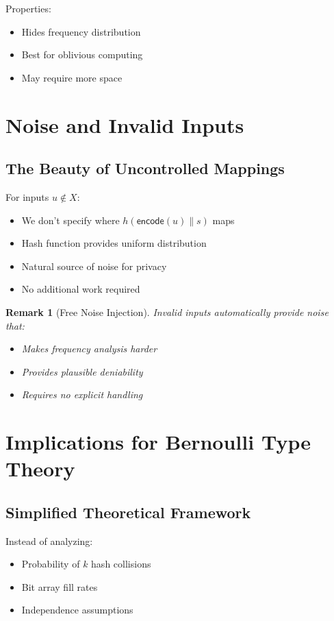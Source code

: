 \documentclass[11pt,final,hidelinks]{article}
\newtheorem{remark}[theorem]{Remark}
\newcommand{\Encode}[1]{\mathsf{encode}(#1)}
\newcommand{\Hash}[1]{h(#1)}
\begin{document}
Properties:
\begin{itemize}
    \item Hides frequency distribution
    \item Best for oblivious computing
    \item May require more space
\end{itemize}

\section{Noise and Invalid Inputs}

\subsection{The Beauty of Uncontrolled Mappings}

For inputs $u \notin X$:
\begin{itemize}
    \item We don't specify where $\Hash{\Encode{u} \| s}$ maps
    \item Hash function provides uniform distribution
    \item Natural source of noise for privacy
    \item No additional work required
\end{itemize}

\begin{remark}[Free Noise Injection]
Invalid inputs automatically provide noise that:
\begin{itemize}
    \item Makes frequency analysis harder
    \item Provides plausible deniability
    \item Requires no explicit handling
\end{itemize}
\end{remark}

\section{Implications for Bernoulli Type Theory}

\subsection{Simplified Theoretical Framework}

Instead of analyzing:
\begin{itemize}
    \item Probability of $k$ hash collisions
    \item Bit array fill rates
    \item Independence assumptions
\end{itemize}
\end{document}
